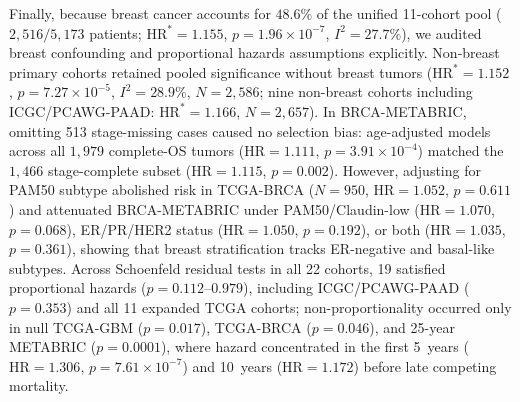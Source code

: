 \documentclass[10pt,twocolumn]{article}
\begin{document}
Finally, because breast cancer accounts for $48.6\%$ of the unified 11-cohort pool ($2,516/5,173$ patients; $\text{HR}^* = 1.155$, $p = 1.96 \times 10^{-7}$, $I^2 = 27.7\%$), we audited breast confounding and proportional hazards assumptions explicitly. Non-breast primary cohorts retained pooled significance without breast tumors ($\text{HR}^* = 1.152$, $p = 7.27 \times 10^{-5}$, $I^2 = 28.9\%$, $N = 2,586$; nine non-breast cohorts including ICGC/PCAWG-PAAD: $\text{HR}^* = 1.166$, $N = 2,657$). In BRCA-METABRIC, omitting 513 stage-missing cases caused no selection bias: age-adjusted models across all $1,979$ complete-OS tumors ($\text{HR} = 1.111$, $p = 3.91 \times 10^{-4}$) matched the $1,466$ stage-complete subset ($\text{HR} = 1.115$, $p = 0.002$). However, adjusting for PAM50 subtype abolished risk in TCGA-BRCA ($N = 950$, $\text{HR} = 1.052$, $p = 0.611$) and attenuated BRCA-METABRIC under PAM50/Claudin-low ($\text{HR} = 1.070$, $p = 0.068$), ER/PR/HER2 status ($\text{HR} = 1.050$, $p = 0.192$), or both ($\text{HR} = 1.035$, $p = 0.361$), showing that breast stratification tracks ER-negative and basal-like subtypes. Across Schoenfeld residual tests in all 22 cohorts, 19 satisfied proportional hazards ($p = 0.112\text{--}0.979$), including ICGC/PCAWG-PAAD ($p = 0.353$) and all 11 expanded TCGA cohorts; non-proportionality occurred only in null TCGA-GBM ($p = 0.017$), TCGA-BRCA ($p = 0.046$), and 25-year METABRIC ($p = 0.0001$), where hazard concentrated in the first 5~years ($\text{HR} = 1.306$, $p = 7.61 \times 10^{-7}$) and 10~years ($\text{HR} = 1.172$) before late competing mortality.
\end{document}
